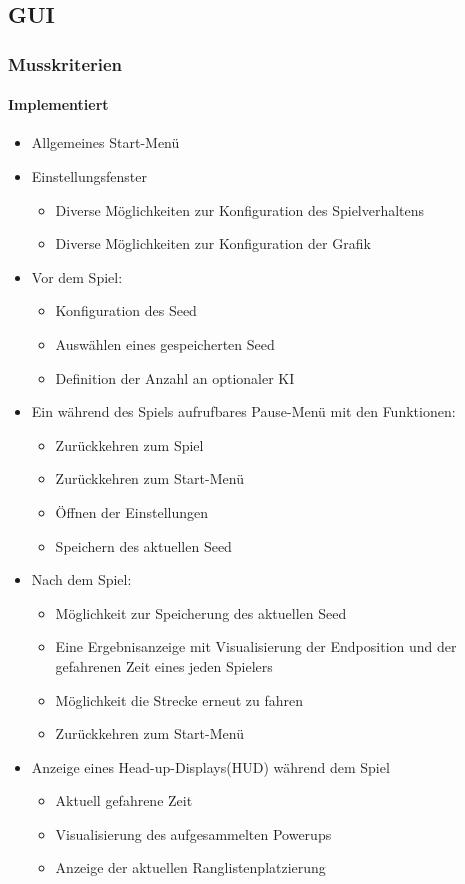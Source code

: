\subsection{GUI}
\subsubsection{Musskriterien}

\paragraph{Implementiert}
\begin{itemize}
    \item Allgemeines Start-Menü
	\item Einstellungsfenster
    \begin{itemize}
        \item Diverse Möglichkeiten zur Konfiguration des Spielverhaltens
        \item Diverse Möglichkeiten zur Konfiguration der Grafik
    \end{itemize}
    \item Vor dem Spiel:
    \begin{itemize}
        \item Konfiguration des Seed
        \item Auswählen eines gespeicherten Seed
        \item Definition der Anzahl an optionaler KI
    \end{itemize}
    \item Ein während des Spiels aufrufbares Pause-Menü mit den Funktionen:
    \begin{itemize}
        \item Zurückkehren zum Spiel
        \item Zurückkehren zum Start-Menü
        \item Öffnen der Einstellungen
        \item Speichern des aktuellen Seed
    \end{itemize}
    \item Nach dem Spiel:
    \begin{itemize}
        \item Möglichkeit zur Speicherung des aktuellen Seed
        \item Eine Ergebnisanzeige mit Visualisierung der Endposition und der gefahrenen Zeit eines jeden Spielers
        \item Möglichkeit die Strecke erneut zu fahren
        \item Zurückkehren zum Start-Menü
    \end{itemize}
    \pagebreak
    \item Anzeige eines Head-up-Displays(HUD) während dem Spiel
    \begin{itemize}
        \item Aktuell gefahrene Zeit
        \item Visualisierung des aufgesammelten Powerups
        \item Anzeige der aktuellen Ranglistenplatzierung
    \end{itemize}
\end{itemize}

